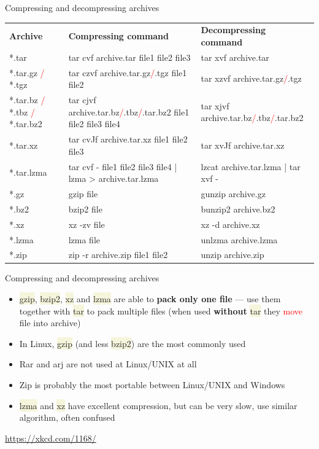 \documentclass[compress, ucs, xelatex, 11pt, xcolor=svgnames, aspectratio=169,
	hyperref={
		bookmarks=true,
		unicode=true,
		colorlinks=true,
		pdftitle={Linux, command line and MetaCentrum},
		plainpages=false,
		pdfauthor={Vojtech Zeisek},
		pdfsubject={Course about use of Linux command line, writing shell scripts and using MetaCentrum of CESNET},
		pdfcreator={XeLaTeX},
		pdfkeywords={Linux, GNU, BASH, shell, command line, MetaCentrum},
		linkcolor=DarkRed, %
		anchorcolor=DarkBlue, %
		citecolor=Indigo, %
		filecolor=NavyBlue, %
		menucolor=DarkMagenta, %
		urlcolor=DarkBlue, %
		pdftex},
	url={hyphens, lowtilde} %
	]{beamer}
\renewcommand{\texttt}[1]{\colorbox{Beige}{{\ttfamily #1}}}
\renewcommand{\alert}[1]{\textcolor{red}{#1}}
\begin{document}
\begin{frame}{Compressing and decompressing archives}
	\begin{center}
		\begin{tabular}{m{2.25cm}m{6.3cm}m{5.3cm}}
			\textbf{Archive} & \textbf{Compressing command} & \textbf{Decompressing command}\\
			*.tar & tar cvf archive.tar file1 file2 file3 & tar xvf archive.tar\\
			*.tar.gz \alert{/} *.tgz & tar czvf archive.tar.gz\alert{/}.tgz file1 file2 & tar xzvf archive.tar.gz\alert{/}.tgz\\
			*.tar.bz \alert{/} *.tbz \alert{/} *.tar.bz2 & tar cjvf archive.tar.bz\alert{/}.tbz\alert{/}.tar.bz2 file1 file2 file3 file4 & tar xjvf archive.tar.bz\alert{/}.tbz\alert{/}.tar.bz2\\
			*.tar.xz & tar cvJf archive.tar.xz file1 file2 file3 & tar xvJf archive.tar.xz\\
			*.tar.lzma & tar cvf - file1 file2 file3 file4 | lzma > archive.tar.lzma & lzcat archive.tar.lzma | tar xvf -\\
			*.gz & gzip file & gunzip archive.gz\\
			*.bz2 & bzip2 file & bunzip2 archive.bz2\\
			*.xz & xz -zv file & xz -d archive.xz\\
			*.lzma & lzma file & unlzma archive.lzma\\
			*.zip & zip -r archive.zip file1 file2 & unzip archive.zip
		\end{tabular}
	\end{center}
\end{frame}

\begin{frame}{Compressing and decompressing archives}
	\begin{itemize}
		\item \texttt{gzip}, \texttt{bzip2}, \texttt{xz} and \texttt{lzma} are able to \textbf{pack only one file} --- use them together with \texttt{tar} to pack multiple files (when used \textbf{without} \texttt{tar} they \alert{move} file into archive)
		\item In Linux, \texttt{gzip} (and less \texttt{bzip2}) are the most commonly used
		\item Rar and arj are not used at Linux/UNIX at all
		\item Zip is probably the most portable between Linux/UNIX and Windows
		\item \texttt{lzma} and \texttt{xz} have excellent compression, but can be very slow, use similar algorithm, often confused
	\end{itemize}
		\hfill
	\begin{center}
		\texttt{[image: tar.png]}
	\end{center}
	\begin{flushright}
		\url{https://xkcd.com/1168/}
	\end{flushright}
\end{frame}
\end{document}
